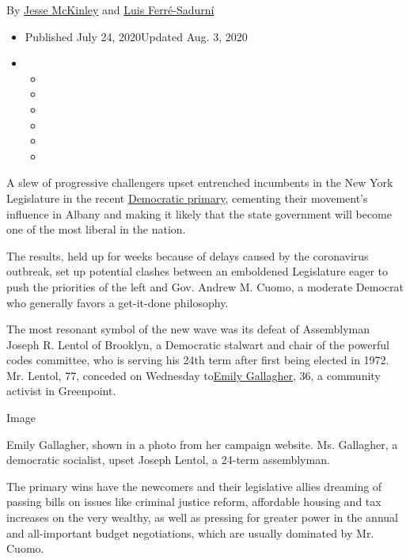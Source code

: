 By \href{https://www.nytimes3xbfgragh.onion/by/jesse-mckinley}{Jesse
McKinley} and
\href{https://www.nytimes3xbfgragh.onion/by/luis-ferre-sadurni}{Luis
Ferré-Sadurní}

\begin{itemize}
\item
  Published July 24, 2020Updated Aug. 3, 2020
\item
  \begin{itemize}
  \item
  \item
  \item
  \item
  \item
  \item
  \end{itemize}
\end{itemize}

A slew of progressive challengers upset entrenched incumbents in the New
York Legislature in the recent
\href{https://www.nytimes3xbfgragh.onion/2020/08/03/nyregion/nyc-mail-ballots-voting.html}{Democratic
primary}, cementing their movement's influence in Albany and making it
likely that the state government will become one of the most liberal in
the nation.

The results, held up for weeks because of delays caused by the
coronavirus outbreak, set up potential clashes between an emboldened
Legislature eager to push the priorities of the left and Gov. Andrew M.
Cuomo, a moderate Democrat who generally favors a get-it-done
philosophy.

The most resonant symbol of the new wave was its defeat of Assemblyman
Joseph R. Lentol of Brooklyn, a Democratic stalwart and chair of the
powerful codes committee, who is serving his 24th term after first being
elected in 1972. Mr. Lentol, 77, conceded on Wednesday
to\href{https://www.emilyforassembly.com/}{Emily Gallagher}, 36, a
community activist in Greenpoint.

Image

Emily Gallagher, shown in a photo from her campaign website. Ms.
Gallagher, a democratic socialist, upset Joseph Lentol, a 24-term
assemblyman.

The primary wins have the newcomers and their legislative allies
dreaming of passing bills on issues like criminal justice reform,
affordable housing and tax increases on the very wealthy, as well as
pressing for greater power in the annual and all-important budget
negotiations, which are usually dominated by Mr. Cuomo.

